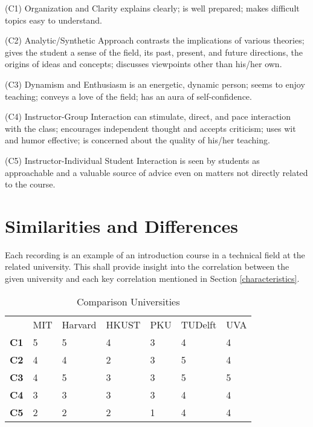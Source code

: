 \documentclass[journal]{IEEEtran}
\begin{document}
\begin{LaTeXdescription}%
  \item[(C1) Organization and Clarity] explains clearly; is well prepared; makes difficult topics easy to understand.
  
  \item[(C2) Analytic/Synthetic Approach] contrasts the implications of various theories; gives the student a sense of the field, its past, present, and future directions, the origins of ideas and concepts; discusses viewpoints other than his/her own.
  
 \item[(C3) Dynamism and Enthusiasm] is an energetic, dynamic person; seems to enjoy teaching; conveys a love of the field; has an aura of self-confidence.

 \item[(C4) Instructor-Group Interaction] can stimulate, direct, and pace interaction with the class; encourages independent thought and accepts criticism; uses wit and humor effective; is concerned about the quality of his/her teaching.

 \item[(C5) Instructor-Individual Student Interaction] is seen by students as approachable and a valuable source of advice even on matters not directly related to the course.
  
\end{LaTeXdescription}

\section{Similarities and Differences}
\label{similarities}

Each recording\cite{mit}\cite{harvard}\cite{hongkong}\cite{peking}\cite{delft}\cite{amsterdam} is an example of an introduction course in a technical field at the related university.
This shall provide insight into the correlation between the given university and each key correlation mentioned in Section \ref{characteristics}. 

\begin{table}[!ht]
\centering
\caption{Comparison Universities}
\label{universities}
\begin{tabular}{lllllll}
\textbf{}   & MIT & Harvard & HKUST & PKU & TUDelft & UVA \\
\textbf{C1} & 5   & 5       & 4     & 3   & 4        & 4       \\
\textbf{C2} & 4   & 4       & 2     & 3   & 5        & 4       \\
\textbf{C3} & 4   & 5       & 3     & 3   & 5        & 5       \\
\textbf{C4} & 3   & 3       & 3     & 3   & 4        & 4       \\
\textbf{C5} & 2   & 2       & 2     & 1   & 4        & 4      
\end{tabular}
\end{table}
\end{document}
